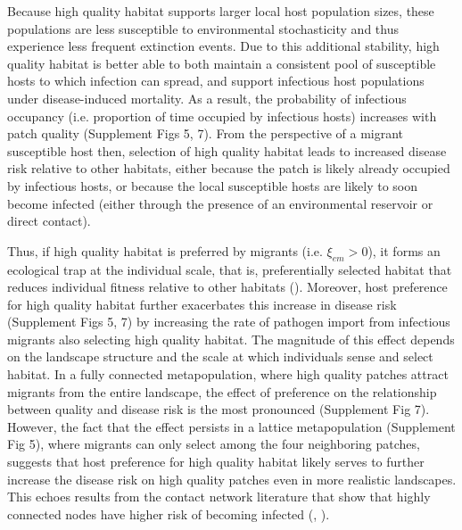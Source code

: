 \documentclass{article}
\begin{document}
Because high quality habitat supports larger local host population sizes, these populations are less susceptible to environmental stochasticity and thus experience less frequent extinction events.
Due to this additional stability, high quality habitat is better able to both maintain a consistent pool of susceptible hosts to which infection can spread, and support infectious host populations under disease-induced mortality. 
As a result, the probability of infectious occupancy (i.e. proportion of time occupied by infectious hosts) increases with patch quality (Supplement Figs 5, 7).
From the perspective of a migrant susceptible host then, selection of high quality habitat leads to increased disease risk relative to other habitats, either because the patch is likely already occupied by infectious hosts, or because the local susceptible hosts are likely to soon become infected (either through the presence of an environmental reservoir or direct contact).

Thus, if high quality habitat is preferred by migrants (i.e. $\xi_{em} > 0$), it forms an ecological trap at the individual scale, that is, preferentially selected habitat that reduces individual fitness relative to other habitats (\cite{Robertson2006}).
Moreover, host preference for high quality habitat further exacerbates this increase in disease risk (Supplement Figs 5, 7) by increasing the rate of pathogen import from infectious migrants also selecting high quality habitat.
The magnitude of this effect depends on the landscape structure and the scale at which individuals sense and select habitat.
In a fully connected metapopulation, where high quality patches attract migrants from the entire landscape, the effect of preference on the relationship between quality and disease risk is the most pronounced (Supplement Fig 7).
However, the fact that the effect persists in a lattice metapopulation (Supplement Fig 5), where migrants can only select among the four neighboring patches, suggests that host preference for high quality habitat likely serves to further increase the disease risk on high quality patches even in more realistic landscapes.
This echoes results from the contact network literature that show that highly connected nodes have higher risk of becoming infected (\cite{Christley2005}, \cite{Keeling2005}).
\end{document}
